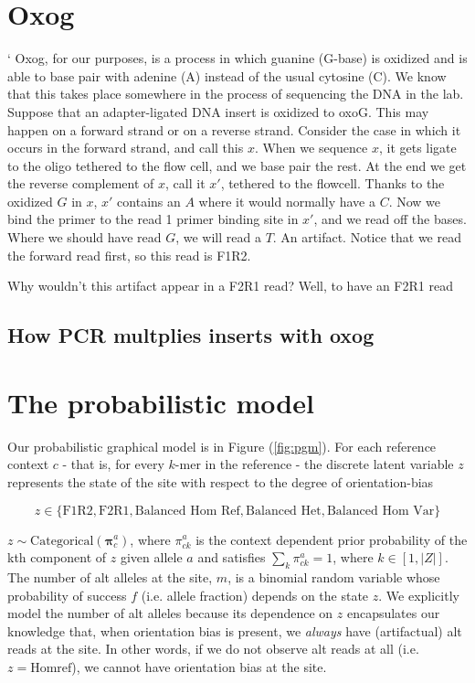 \documentclass[a4paper]{article}
\newcommand{\vpi}{{\bm \pi}}
\begin{document}
\section{Oxog}
`
Oxog, for our purposes, is a process in which guanine (G-base) is oxidized and is able to base pair with adenine (A) instead of the usual cytosine (C). We know that this takes place somewhere in the process of sequencing the DNA in the lab. Suppose that an adapter-ligated DNA insert is oxidized to oxoG. This may happen on a forward strand or on a reverse strand. Consider the case in which it occurs in the forward strand, and call this $x$. When we sequence $x$, it gets ligate to the oligo tethered to the flow cell, and we base pair the rest. At the end we get the reverse complement of $x$, call it $x'$, tethered to the flowcell. Thanks to the oxidized $G$ in $x$, $x'$ contains an $A$ where it would normally have a $C$. Now we bind the primer to the read 1 primer binding site in $x'$, and we read off the bases. Where we should have read $G$, we will read a $T$. An artifact. Notice that we read the forward read first, so this read is F1R2.

Why wouldn't this artifact appear in a F2R1 read? Well, to have an F2R1 read

\subsection{How PCR multplies inserts with oxog}


\section{The probabilistic model}

Our probabilistic graphical model is in Figure (\ref{fig:pgm}). For each reference context $c$ - that is, for every $k$-mer in the reference - the discrete latent variable $z$ represents the state of the site with respect to the degree of orientation-bias 

\begin{equation*}
z \in \{ \text{F1R2}, \text{F2R1}, \text{Balanced Hom Ref}, \text{Balanced Het}, \text{Balanced Hom Var} \}
\end{equation*}

$z \sim \mathrm{Categorical}(\vpi^a_c)$, where $\pi^a_{ck}$ is the context dependent prior probability of the kth component of $z$ given allele $a$ and satisfies $\sum_k \pi^a_{ck} = 1$, where $k \in [1, |Z|]$. The number of alt alleles at the site, $m$, is a binomial random variable whose probability of success $f$ (i.e. allele fraction) depends on the state $z$. We explicitly model the number of alt alleles because its dependence on $z$ encapsulates our knowledge that, when orientation bias is present, we \textit{always} have (artifactual) alt reads at the site. In other words, if we do not observe alt reads at all (i.e. $z = \mathrm{Hom ref}$), we cannot have orientation bias at the site. 
\end{document}
